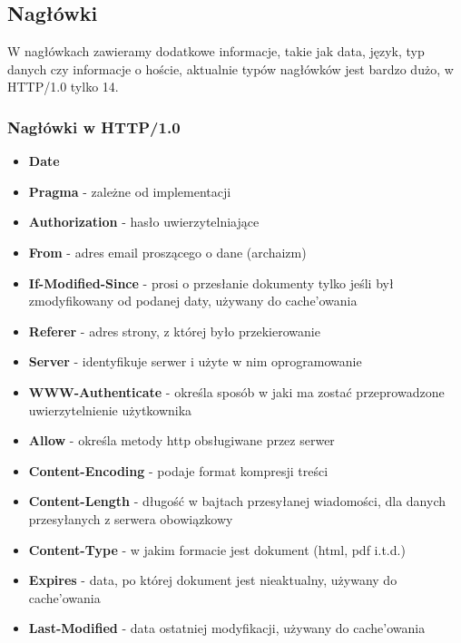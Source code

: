 \subsection{Nagłówki}
W nagłówkach zawieramy dodatkowe informacje, takie jak data, język, typ danych czy informacje o hoście, aktualnie typów nagłówków jest bardzo dużo, w HTTP/1.0 tylko 14.\\
\subsubsection{Nagłówki w HTTP/1.0}
\begin{multicols}{2}
\begin{itemize}
    \item \textbf{Date}
    \item \textbf{Pragma} - zależne od implementacji
    \item \textbf{Authorization} - hasło uwierzytelniające
    \item \textbf{From} - adres email proszącego o dane (archaizm)
    \item \textbf{If-Modified-Since} - prosi o przesłanie dokumenty tylko jeśli był zmodyfikowany od podanej daty, używany do cache'owania
    \item \textbf{Referer} - adres strony, z której było przekierowanie
    \item \textbf{Server} - identyfikuje serwer i użyte w nim oprogramowanie
    \item \textbf{WWW-Authenticate} - określa sposób w jaki ma zostać przeprowadzone uwierzytelnienie użytkownika
    \item \textbf{Allow} - określa metody http obsługiwane przez serwer
    \item \textbf{Content-Encoding} - podaje format kompresji treści
    \item \textbf{Content-Length} - długość w bajtach przesyłanej wiadomości, dla danych przesyłanych z serwera obowiązkowy
    \item \textbf{Content-Type} - w jakim formacie jest dokument (html, pdf i.t.d.)
    \item \textbf{Expires} - data, po której dokument jest nieaktualny, używany do cache'owania
    \item \textbf{Last-Modified} - data ostatniej modyfikacji, używany do cache'owania
\end{itemize}
\end{multicols}
